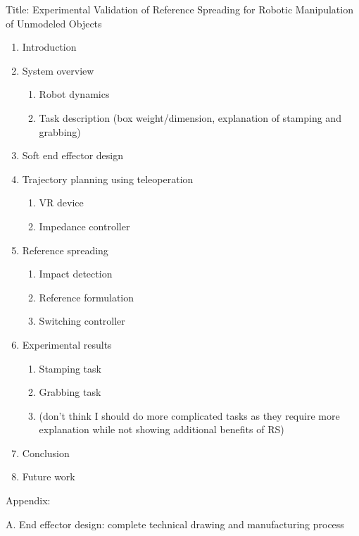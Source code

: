 \documentclass[11pt]{report}
\numberwithin{equation}{section}        %
\numberwithin{figure}{section}          %
\numberwithin{table}{section}           %
\begin{document}
   Title: Experimental Validation of Reference Spreading for Robotic Manipulation of Unmodeled Objects
\begin{enumerate}
      \item Introduction

      \item System overview
\begin{enumerate}
      \item  Robot dynamics
      \item Task description (box weight/dimension, explanation of stamping and grabbing)
 \end{enumerate}
      \item Soft end effector design

      \item Trajectory planning using teleoperation
\begin{enumerate}
     \item  VR device

       \item  Impedance controller
\end{enumerate}
      \item Reference spreading
\begin{enumerate}
       \item  Impact detection

      \item  Reference formulation

       \item  Switching controller
\end{enumerate}
     \item  Experimental results
\begin{enumerate}
       \item  Stamping task

      \item  Grabbing task

       \item  (don’t think I should do more complicated tasks as they require more explanation while not showing additional benefits of RS)
      \end{enumerate}
     \item   Conclusion
    
     \item  Future work


\end{enumerate}
Appendix:

A.  End effector design: complete technical drawing and manufacturing process
\end{document}
